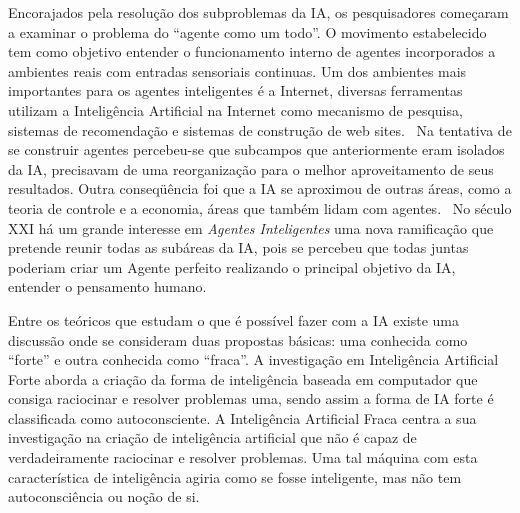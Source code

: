 Encorajados pela resolução dos subproblemas da IA, os pesquisadores começaram a examinar o problema do ``agente como um todo''. O movimento estabelecido tem como objetivo entender o funcionamento interno de agentes incorporados a ambientes reais com entradas sensoriais continuas. Um dos ambientes mais importantes para os agentes inteligentes é a Internet, diversas ferramentas utilizam a Inteligência Artificial na Internet como mecanismo de pesquisa, sistemas de recomendação e sistemas de construção de web sites.~\cite{livro_russel}
Na tentativa de se construir agentes percebeu-se que subcampos que anteriormente eram isolados da IA, precisavam de uma reorganização para o melhor aproveitamento de seus resultados.
Outra conseqüência foi que a IA se aproximou de outras áreas, como a teoria de controle e a economia, áreas que também lidam com agentes.~\cite{livro_russel}
No século XXI há um grande interesse em \textit{Agentes Inteligentes} uma nova ramificação que pretende reunir todas as subáreas da IA, pois se percebeu que todas juntas poderiam criar um Agente perfeito realizando o principal objetivo da IA, entender o pensamento humano.

Entre os teóricos que estudam o que é possível fazer com a IA existe uma discussão onde se consideram duas propostas básicas: uma conhecida como ``forte'' e outra conhecida como ``fraca''.
A investigação em Inteligência Artificial Forte aborda a criação da forma de inteligência baseada em computador que consiga raciocinar e resolver problemas uma, sendo assim a forma de IA forte é classificada como autoconsciente.
A Inteligência Artificial Fraca centra a sua investigação na criação de inteligência artificial que não é capaz de verdadeiramente raciocinar e resolver problemas. Uma tal máquina com esta característica de inteligência agiria como se fosse inteligente, mas não tem autoconsciência ou noção de si.


